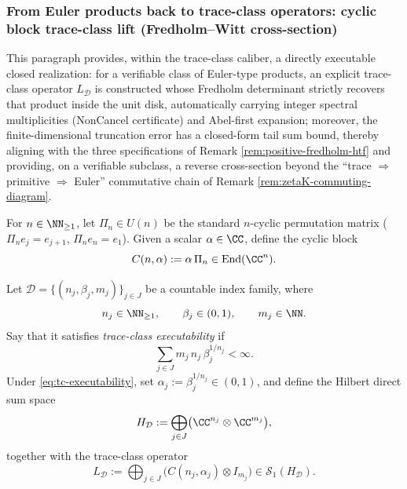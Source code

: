 \subsubsection{From Euler products back to trace-class operators: cyclic block trace-class lift (Fredholm--Witt cross-section)}\label{subsec:cyclic-traceclass-lift}

This paragraph provides, within the trace-class caliber, a directly executable closed realization: for a verifiable class of Euler-type products, an explicit trace-class operator \(L_{\mathcal D}\) is constructed whose Fredholm determinant strictly recovers that product inside the unit disk, automatically carrying integer spectral multiplicities (NonCancel certificate) and Abel-first expansion; moreover, the finite-dimensional truncation error has a closed-form tail sum bound, thereby aligning with the three specifications of Remark \ref{rem:positive-fredholm-htf} and providing, on a verifiable subclass, a reverse cross-section beyond the ``trace \(\Rightarrow\) primitive \(\Rightarrow\) Euler'' commutative chain of Remark \ref{rem:zetaK-commuting-diagram}.

\begin{definition}\label{def:cyclic-block}
For \(n\in\NN_{\ge 1}\), let \(\Pi_n\in U(n)\) be the standard \(n\)-cyclic permutation matrix (\(\Pi_n e_j=e_{j+1}\), \(\Pi_n e_n=e_1\)).
Given a scalar \(\alpha\in\CC\), define the cyclic block
\[
C(n,\alpha):=\alpha\,\Pi_n\in \mathrm{End}(\CC^n).
\]
\end{definition}

\begin{definition}\label{def:traceclass-primitive-data}
Let \(\mathcal D=\{(n_j,\beta_j,m_j)\}_{j\in J}\) be a countable index family, where
\[
n_j\in\NN_{\ge 1},\qquad \beta_j\in(0,1),\qquad m_j\in\NN.
\]
Say that it satisfies \emph{trace-class executability} if
\begin{equation}\label{eq:tc-executability}
\sum_{j\in J} m_j\,n_j\,\beta_j^{1/n_j}<\infty.
\end{equation}
Under \eqref{eq:tc-executability}, set \(\alpha_j:=\beta_j^{1/n_j}\in(0,1)\), and define the Hilbert direct sum space
\[
H_{\mathcal D}:=\bigoplus_{j\in J}\bigl(\CC^{n_j}\otimes \CC^{m_j}\bigr),
\]
together with the trace-class operator
\[
L_{\mathcal D}:=\bigoplus_{j\in J}\bigl(C(n_j,\alpha_j)\otimes I_{m_j}\bigr)\in\mathcal{S}_1(H_{\mathcal D}).
\]
\end{definition}

